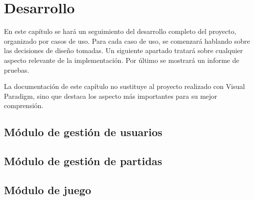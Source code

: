 \chapter{Desarrollo}

En este capítulo se hará un seguimiento del desarrollo completo del proyecto,
organizado por casos de uso. Para cada caso de uso, se comenzará hablando sobre
las decisiones de diseño tomadas. Un siguiente apartado tratará sobre cualquier
aspecto relevante de la implementación. Por último se mostrará un informe de
pruebas.

La documentación de este capítulo no sustituye al proyecto realizado con Visual
Paradigm, sino que destaca los aspecto más importantes para su mejor
comprensión.

\section{Módulo de gestión de usuarios}



\section{Módulo de gestión de partidas}





\section{Módulo de juego}



